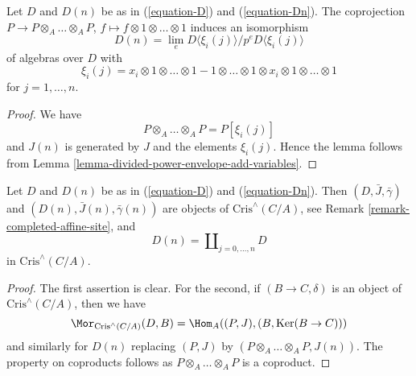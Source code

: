 \begin{lemma}
\label{lemma-structure-Dn}
Let $D$ and $D(n)$ be as in (\ref{equation-D}) and (\ref{equation-Dn}).
The coprojection $P \to P \otimes_A \ldots \otimes_A P$,
$f \mapsto f \otimes 1 \otimes \ldots \otimes 1$
induces an isomorphism
\begin{equation}
\label{equation-structure-Dn}
D(n) = \lim_e D\langle \xi_i(j) \rangle/p^eD\langle \xi_i(j) \rangle
\end{equation}
of algebras over $D$ with
$$
\xi_i(j) = x_i \otimes 1 \otimes \ldots \otimes 1 -
1 \otimes \ldots \otimes 1 \otimes x_i \otimes 1 \otimes \ldots \otimes 1
$$
for $j = 1, \ldots, n$.
\end{lemma}

\begin{proof}
We have
$$
P \otimes_A \ldots \otimes_A P = P[\xi_i(j)]
$$
and $J(n)$ is generated by $J$ and the elements $\xi_i(j)$.
Hence the lemma follows from
Lemma \ref{lemma-divided-power-envelope-add-variables}.
\end{proof}

\begin{lemma}
\label{lemma-property-Dn}
Let $D$ and $D(n)$ be as in (\ref{equation-D}) and (\ref{equation-Dn}).
Then $(D, \bar J, \bar\gamma)$ and $(D(n), \bar J(n), \bar\gamma(n))$
are objects of $\text{Cris}^\wedge(C/A)$, see
Remark \ref{remark-completed-affine-site}, and
$$
D(n) = \coprod\nolimits_{j = 0, \ldots, n} D
$$
in $\text{Cris}^\wedge(C/A)$.
\end{lemma}

\begin{proof}
The first assertion is clear. For the second, if $(B \to C, \delta)$ is an
object of $\text{Cris}^\wedge(C/A)$, then we have
$$
\Mor_{\text{Cris}^\wedge(C/A)}(D, B) = 
\Hom_A((P, J), (B, \text{Ker}(B \to C)))
$$
and similarly for $D(n)$ replacing $(P, J)$ by
$(P \otimes_A \ldots \otimes_A P, J(n))$. The property on coproducts follows
as $P \otimes_A \ldots \otimes_A P$ is a coproduct.
\end{proof}


